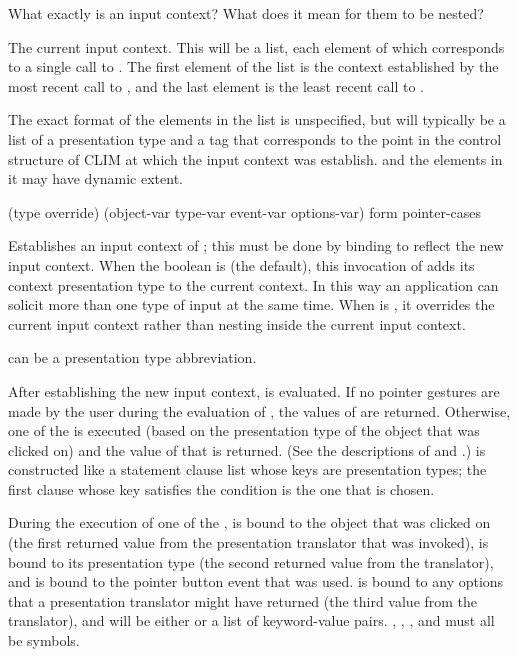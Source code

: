  {What exactly is an input context?  What does it mean for them to
be nested?}


The current input context.  This will be a list, each element of which
corresponds to a single call to .  The first element of
the list is the context established by the most recent call to
, and the last element is the least recent call to
.

The exact format of the elements in the list is unspecified, but will typically
be a list of a presentation type and a tag that corresponds to the point in the
control structure of CLIM at which the input context was establish.
 and the elements in it may have dynamic extent.

 {(type \key override)
                                (\optional object-var type-var event-var options-var)
                                form
                                \body pointer-cases} 

Establishes an input context of  ; this must
be done by binding  to reflect the new input context.  When
the boolean  is  (the default), this invocation of
 adds its context presentation type to the current
context.  In this way an application can solicit more than one type of input at
the same time.  When  is , it overrides the current
input context rather than nesting inside the current input context.

 can be a presentation type abbreviation.

After establishing the new input context,  is evaluated.  If no
pointer gestures are made by the user during the evaluation of , the
values of  are returned.  Otherwise, one of the  is
executed (based on the presentation type of the object that was clicked on) and
the value of that is returned.  (See the descriptions of
 and .)
 is constructed like a  statement clause list whose
keys are presentation types; the first clause whose key satisfies the condition
 is the one that is chosen.

During the execution of one of the ,  is
bound to the object that was clicked on (the first returned value from the
presentation translator that was invoked),  is bound to its
presentation type (the second returned value from the translator), and
 is bound to the pointer button event that was used.
 is bound to any options that a presentation translator might
have returned (the third value from the translator), and will be either 
or a list of keyword-value pairs.  , ,
, and  must all be symbols.

